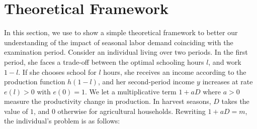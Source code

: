 \documentclass[12pt,letterpaper]{article}
\newcommand{\0}{\ensuremath{\mbox{\boldmath $0$}}}
\begin{document}
\appendix
\setcounter{secnumdepth}{1}
\setcounter{section}{0}
\renewcommand{\thesection}{A\arabic{section}}


\section{Theoretical Framework}\label{app_a1}
\setcounter{equation}{0}
\renewcommand{\theequation}{A\arabic{equation}}

In this section, we use \cite{BalandRobinson2000} to show a simple theoretical framework to better our understanding of the impact of seasonal labor demand coinciding with the examination period. Consider an individual living over two periods. In the first period, she faces a trade-off between the optimal schooling hours $l$, and work $1-l$. If she chooses school for $l$ hours, she receives an income according to the production function $h(1-l)$, and her second-period income $y$ increases at rate $e(l)>0$ with $e(0) = 1$. We let a multiplicative term $1+aD$ where $a>0$ 	measure the productivity change in production. In harvest seasons, $D$ takes the value of $1$, and $0$ otherwise for agricultural households. Rewriting $1+aD = m$, the individual's problem is as follows:
\end{document}
